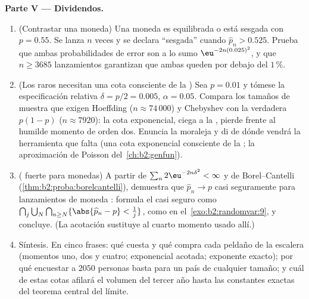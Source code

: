 \begin{problem}
\medskip
\noindent\textbf{Parte V --- Dividendos.}
\begin{enumerate}[resume]
  \item (Contrastar una moneda) Una moneda es equilibrada o está
        sesgada con $p = 0.55$. Se lanza $n$ veces y se declara
        ``sesgada'' cuando $\widehat p_n > 0.525$. Prueba que ambas
        probabilidades de error son a lo sumo
        $\eu^{-2n(0.025)^2}$, y que $n \geq 3685$ lanzamientos
        garantizan que ambas queden por debajo del $1\,\%$.
  \item (Los  raros necesitan una cota consciente de la
        ) Sea $p = 0.01$ y tómese la especificación relativa
        $\delta = p/2 = 0.005$, $\alpha = 0.05$. Compara los tamaños
        de muestra que exigen Hoeffding ($n \approx 74\,000$) y
        Chebyshev con la  verdadera $p(1-p)$ ($n \approx
        7920$): la cota exponencial, ciega a la , pierde
        frente al humilde momento de orden dos. Enuncia la moraleja y
        di de dónde vendrá la herramienta que falta (una cota
        exponencial consciente de la ; la aproximación de
        Poisson del~\cref{ch:b2:genfun}).
  \item ( fuerte para monedas) A partir de $\sum_n
        2\eu^{-2n\delta^2} < \infty$ y de Borel--Cantelli
        (\cref{thm:b2:proba:borelcantelli}), demuestra que $\widehat
        p_n \to p$ casi seguramente para lanzamientos de moneda
        : formula el  casi seguro como
        $\bigcap_j\bigcup_N\bigcap_{n\geq N} \{\abs{\widehat p_n - p}
        < \tfrac1j\}$, como en el~\cref{exo:b2:randomvar:9}, y
        concluye. (La acotación sustituye al cuarto momento usado
        allí.)
  \item Síntesis. En cinco frases: qué cuesta y qué compra cada
        peldaño de la escalera (momentos uno, dos y cuatro;
        exponencial acotada; exponente exacto); por qué encuestar a
        $2050$ personas basta para un país de cualquier tamaño; y
        cuál de estas cotas afilará el volumen del tercer año hasta
        las constantes exactas del teorema central del límite.
\end{enumerate}
\end{problem}
